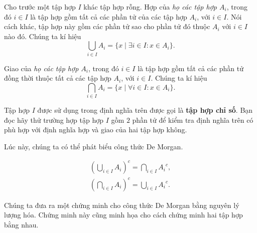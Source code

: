 \begin{definition}
    Cho trước một tập hợp $I$ khác tập hợp rỗng. Hợp của \textit{họ các tập hợp $A_{i}$}, trong đó $i\in I$ là tập hợp gồm tất cả các phần tử của các tập hợp $A_{i}$, với $i\in I$. Nói cách khác, tập hợp này gồm các phần tử sao cho phần tử đó thuộc $A_{i}$ với $i\in I$ nào đó. Chúng ta kí hiệu
    \[
        \bigcup_{i\in I}A_{i} = \{ x \mid \exists i\in I: x\in A_{i} \}.
    \]

    Giao của \textit{họ các tập hợp $A_{i}$}, trong đó $i\in I$ là tập hợp gồm tất cả các phần tử đồng thời thuộc tất cả các tập hợp $A_{i}$, với $i\in I$. Chúng ta kí hiệu
    \[
        \bigcap_{i\in I}A_{i} = \{ x \mid \forall i\in I: x\in A_{i} \}.
    \]
\end{definition}

Tập hợp $I$ được sử dụng trong định nghĩa trên được gọi là \textbf{tập hợp chỉ số}. Bạn đọc hãy thử trường hợp tập hợp $I$ gồm $2$ phần tử để kiểm tra định nghĩa trên có phù hợp với định nghĩa hợp và giao của hai tập hợp không.

Lúc này, chúng ta có thể phát biểu công thức De Morgan.

\begin{theorem}\label{theorem:de-morgan-formula}
    \begin{equation*}
        \begin{split}
            {\left(\bigcup_{i\in I}A_{i}\right)}^{c} = \bigcap_{i\in I}{A_{i}}^{c}, \\
            {\left(\bigcap_{i\in I}A_{i}\right)}^{c} = \bigcup_{i\in I}{A_{i}}^{c}.
        \end{split}
    \end{equation*}
\end{theorem}

\noindent Chúng ta đưa ra một chứng minh cho công thức De Morgan bằng nguyên lý lượng hóa. Chứng minh này cũng minh họa cho cách chứng minh hai tập hợp bằng nhau.


